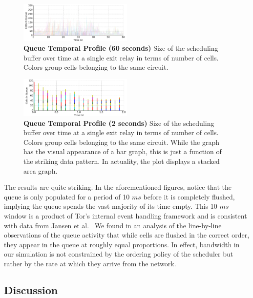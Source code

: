 \begin{figure} \centering
  \includegraphics[width=0.5\textwidth]{images/scheduling_far.png}
  \caption[Queue Temporal Profile (60 seconds)]{\textbf{Queue Temporal Profile
      (60 seconds)} Size of the scheduling buffer over time at a single exit
    relay in terms of number of cells. Colors group cells belonging to the same circuit.}
  \label{fig:scheduling_far}
\end{figure}

\begin{figure} \centering
  \includegraphics[width=0.5\textwidth]{images/scheduling_close.png}
  \caption[Queue Temporal Profile (2 seconds)]{\textbf{Queue Temporal Profile
      (2 seconds)} Size of the scheduling buffer over time at a single exit
    relay in terms of number of cells. Colors group cells belonging to the same
    circuit. While the graph has the visual appearance of a bar graph, this is
    just a function of the striking data pattern. In actuality, the plot
    displays a stacked area graph.}
  \label{fig:scheduling_close}
\end{figure}


The results are quite striking. In the aforementioned figures, notice that the
queue is only populated for a period of 10 $ms$ before it is completely
flushed, implying the queue spends the vast majority of its time empty. This 10
$ms$ window is a product of Tor's internal event handling framework and is
consistent with data from Jansen et al.~\cite{jansen2017tor} We found in an
analysis of the line-by-line observations of the queue activity that while cells
are flushed in the correct order, they appear in the queue at roughly equal
proportions. In effect, bandwidth in our simulation is not constrained by the
ordering policy of the scheduler but rather by the rate at which they arrive
from the network.

\subsection{Discussion}

